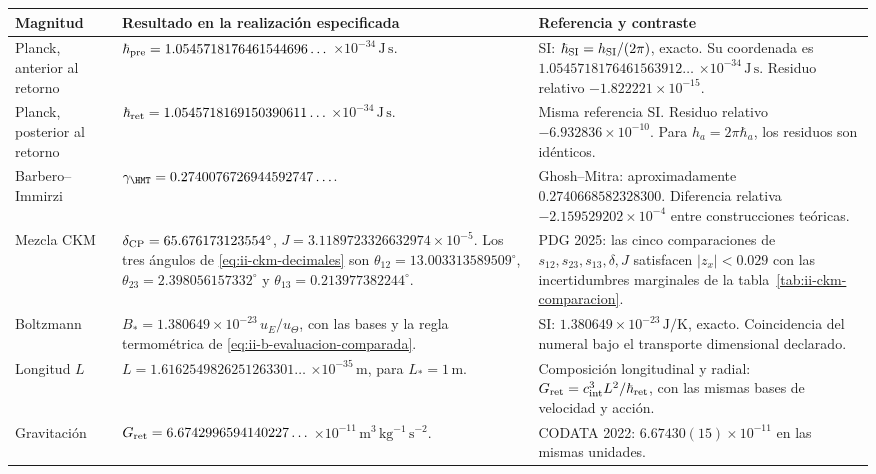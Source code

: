\begin{table}[!htbp]
\centering\small
\setlength{\tabcolsep}{4pt}
\renewcommand{\arraystretch}{1.12}
\begin{tabularx}{\linewidth}{@{}>{\raggedright\arraybackslash}p{.16\linewidth}>{\raggedright\arraybackslash}X>{\raggedright\arraybackslash}X@{}}
\toprule
Magnitud & Resultado en la realización especificada & Referencia y contraste\\
\midrule
Planck, anterior al retorno
& \(\hbar_{\rm pre}=1.0545718176461544696\ldots\)
  \(\times10^{-34}\,\mathrm{J\,s}\).
& SI: \(\hbar_{\rm SI}=h_{\rm SI}/(2\pi)\), exacto.
  Su coordenada es \(1.0545718176461563912\ldots\)
  \(\times10^{-34}\,\mathrm{J\,s}\).
  Residuo relativo \(-1.822221\times10^{-15}\).\\[4pt]
Planck, posterior al retorno
& \(\hbar_{\rm ret}=1.0545718169150390611\ldots\)
  \(\times10^{-34}\,\mathrm{J\,s}\).
& Misma referencia SI.
  Residuo relativo \(-6.932836\times10^{-10}\).
  Para \(h_a=2\pi\hbar_a\), los residuos son idénticos.\\[4pt]
Barbero--Immirzi
& \(\gamma_{\HMT}=0.2740076726944592747\ldots\).
& Ghosh--Mitra: aproximadamente \(0.2740668582328300\).
  Diferencia relativa \(-2.159529202\times10^{-4}\)
  entre construcciones teóricas.\\[4pt]
Mezcla CKM
& \(\delta_{\rm CP}=65.676173123554^\circ\),
  \(J=3.1189723326632974\times10^{-5}\).
  Los tres ángulos de \eqref{eq:ii-ckm-decimales} son
  \(\theta_{12}=13.003313589509^\circ\),
  \(\theta_{23}=2.398056157332^\circ\) y
  \(\theta_{13}=0.213977382244^\circ\).
& PDG 2025: las cinco comparaciones de
  \(s_{12},s_{23},s_{13},\delta,J\) satisfacen \(|z_x|<0.029\)
  con las incertidumbres marginales de la
  tabla~\ref{tab:ii-ckm-comparacion}.\\[4pt]
Boltzmann
& \(B_*=1.380649\times10^{-23}\,u_E/u_\Theta\),
  con las bases y la regla termométrica de
  \eqref{eq:ii-b-evaluacion-comparada}.
& SI: \(1.380649\times10^{-23}\,\mathrm{J/K}\), exacto.
  Coincidencia del numeral bajo el transporte dimensional declarado.\\[4pt]
Longitud \(L\)
& \(L=1.6162549826251263301\ldots\)
  \(\times10^{-35}\,\mathrm m\), para \(L_*=1\,\mathrm m\).
& Composición longitudinal y radial:
  \(G_{\rm ret}=c_{\rm int}^3L^2/\hbar_{\rm ret}\),
  con las mismas bases de velocidad y acción.\\[4pt]
Gravitación
& \(G_{\rm ret}=6.6742996594140227\ldots\)
  \(\times10^{-11}\,\mathrm{m^3\,kg^{-1}\,s^{-2}}\).
& CODATA 2022: \(6.67430(15)\times10^{-11}\) en las mismas unidades.

\end{tabularx}
\end{table}
